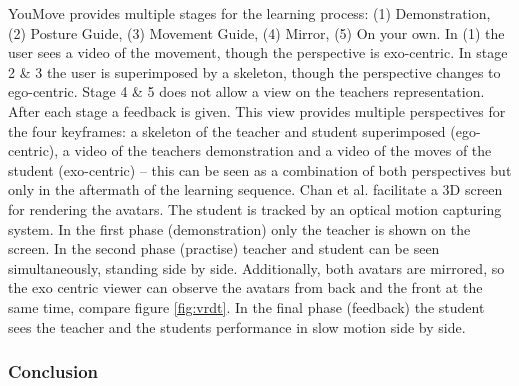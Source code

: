 YouMove \cite{Anderson2013} provides multiple stages for the learning process: (1) Demonstration, (2) Posture Guide, (3) Movement Guide, (4) Mirror, (5) On your own. In (1) the user sees a video of the movement, though the perspective is exo-centric. In stage 2 \& 3 the user is superimposed by a skeleton, though the perspective changes to ego-centric. Stage 4 \& 5 does not allow a view on the teachers representation. After each stage a feedback is given. This view provides multiple perspectives for the four keyframes: a skeleton of the teacher and student superimposed (ego-centric), a video of the teachers demonstration and a video of the moves of the student (exo-centric) \--- this can be seen as a combination of both perspectives but only in the aftermath of the learning sequence.
Chan et al. \cite{Chan2011} facilitate a 3D screen for rendering the avatars. The student is tracked by an optical motion capturing system. In the first phase (demonstration) only the teacher is shown on the screen. In the second phase (practise) teacher and student can be seen simultaneously, standing side by side. Additionally, both avatars are mirrored, so the exo centric viewer can observe the avatars from back and the front at the same time, compare figure \ref{fig:vrdt}. In the final phase (feedback) the student sees the teacher and the students performance in slow motion side by side.
\subsubsection{Conclusion}

